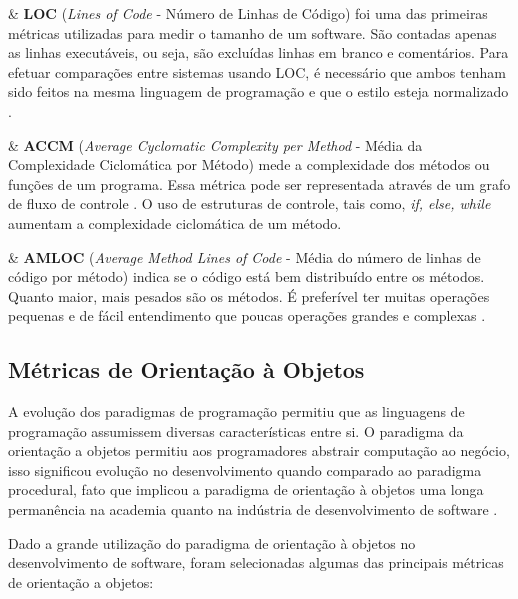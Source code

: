 \begin{easylist}[itemize]


	& \textbf{LOC} (\textit{Lines of Code} - Número de Linhas de Código)
	foi uma das primeiras métricas utilizadas para medir o tamanho de um 
	software. São contadas apenas as linhas executáveis, ou seja, são excluídas linhas em branco e comentários. Para efetuar comparações entre sistemas usando LOC, é necessário que ambos tenham sido feitos na mesma linguagem de programação e que o estilo esteja normalizado \cite{Jones91}.
	
	& \textbf{ACCM} (\textit{Average Cyclomatic Complexity per Method} - 
	Média da Complexidade Ciclomática por Método) mede a complexidade dos 
	métodos ou funções de um programa. Essa métrica pode ser representada 
	através de um grafo de fluxo de controle \cite{McCabe76}. O uso de 
	estruturas de controle, tais como, \textit{if, else, while} aumentam a 
	complexidade ciclomática de um método.

	& \textbf{AMLOC} (\textit{Average Method Lines of Code} - Média do número de linhas de código por método)  indica se o código está bem distribuído entre os métodos. Quanto maior, mais pesados são os métodos. É preferível ter muitas operações pequenas e de fácil entendimento que poucas operações grandes e complexas \cite{Meirelles2013}.

\end{easylist}


\subsection{Métricas de Orientação à Objetos}
\label{métrica objetos}

A evolução dos paradigmas de programação permitiu que as linguagens de 
programação assumissem diversas características entre si. O
paradigma da orientação a objetos permitiu aos programadores abstrair computação ao negócio, isso significou evolução no desenvolvimento quando comparado ao paradigma procedural, fato que implicou a paradigma de orientação à objetos uma longa permanência na academia quanto na indústria de desenvolvimento de software \cite{Li1993}.

Dado a grande utilização do paradigma de orientação à objetos no desenvolvimento de software, foram selecionadas algumas das principais métricas de orientação a objetos:



